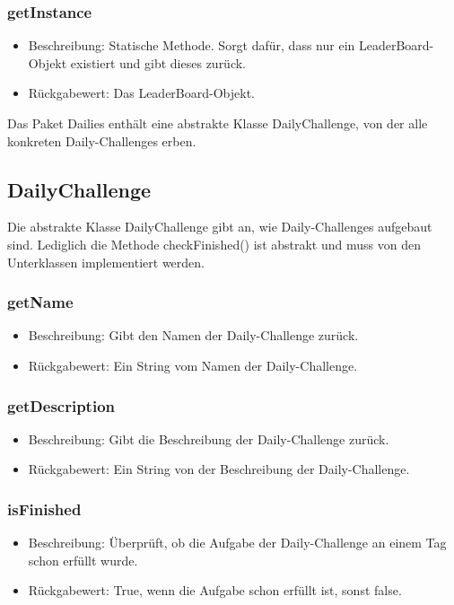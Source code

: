 \documentclass[a4paper]{scrreprt}
\begin{document}
	\subsubsection{getInstance}
	\begin{itemize}
		\item Beschreibung: Statische Methode. Sorgt dafür, dass nur ein LeaderBoard-Objekt existiert und gibt dieses zurück.
		\item Rückgabewert: Das LeaderBoard-Objekt.
	\end{itemize}
	
	Das Paket Dailies enthält eine abstrakte Klasse DailyChallenge, von der alle konkreten Daily-Challenges erben.
	
	\subsection{DailyChallenge}
	Die abstrakte Klasse DailyChallenge gibt an, wie Daily-Challenges aufgebaut sind. Lediglich die Methode checkFinished() ist abstrakt und muss von den Unterklassen implementiert werden.
	\subsubsection{getName}
	\begin{itemize}
		\item Beschreibung: Gibt den Namen der Daily-Challenge zurück.
		\item Rückgabewert: Ein String vom Namen der Daily-Challenge.
	\end{itemize}
	\subsubsection{getDescription}
	\begin{itemize}
		\item Beschreibung: Gibt die Beschreibung der Daily-Challenge zurück.
		\item Rückgabewert: Ein String von der Beschreibung der Daily-Challenge.
	\end{itemize}
	\subsubsection{isFinished}
	\begin{itemize}
		\item Beschreibung: Überprüft, ob die Aufgabe der Daily-Challenge an einem Tag schon erfüllt wurde.
		\item Rückgabewert: True, wenn die Aufgabe schon erfüllt ist, sonst false.
	\end{itemize}
\end{document}
